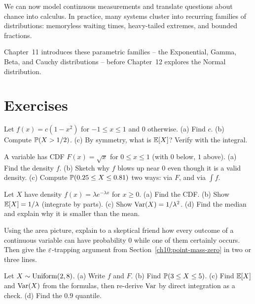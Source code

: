 \begin{connectionbox}
We can now model continuous measurements and translate questions about chance into
calculus. In practice, many systems cluster into recurring families of distributions:
memoryless waiting times, heavy-tailed extremes, and bounded fractions.

Chapter~11 introduces these parametric families -- the Exponential, Gamma, Beta, and
Cauchy distributions -- before Chapter~12 explores the Normal distribution.
\end{connectionbox}

\section{Exercises}
\label{ch10:exercises}

\begin{exercise}
\label{ch10:exr-norm}
Let $f(x) = c(1-x^2)$ for $-1 \le x \le 1$ and $0$ otherwise.
(a) Find $c$. (b) Compute $\P(X > 1/2)$. (c) By symmetry, what is $\E[X]$? Verify
with the integral.
\end{exercise}

\begin{exercise}
\label{ch10:exr-cdf}
A variable has CDF $F(x) = \sqrt{x}$ for $0 \le x \le 1$ (with $0$ below, $1$ above).
(a) Find the density $f$. (b) Sketch why $f$ blows up near $0$ even though it is a
valid density. (c) Compute $\P(0.25 \le X \le 0.81)$ two ways: via $F$, and via
$\int f$.
\end{exercise}

\begin{exercise}
\label{ch10:exr-expo}
Let $X$ have density $f(x) = \lambda e^{-\lambda x}$ for $x \ge 0$. (a) Find the CDF.
(b) Show $\E[X] = 1/\lambda$ (integrate by parts). (c) Show $\Var(X)=1/\lambda^2$.
(d) Find the median and explain why it is smaller than the mean.
\end{exercise}

\begin{exercise}[Why $\P(X=x)=0$ in your own words]
\label{ch10:exr-pointmass}
Using the area picture, explain to a skeptical friend how every outcome of a
continuous variable can have probability $0$ while one of them certainly occurs.
Then give the $\eps$-trapping argument from Section~\ref{ch10:point-mass-zero} in two
or three lines.
\end{exercise}

\begin{exercise}
\label{ch10:exr-unif}
Let $X \sim \Unif(2,8)$. (a) Write $f$ and $F$. (b) Find $\P(3 \le X \le 5)$.
(c) Find $\E[X]$ and $\Var(X)$ from the formulas, then re-derive $\Var$ by direct
integration as a check. (d) Find the $0.9$ quantile.
\end{exercise}

